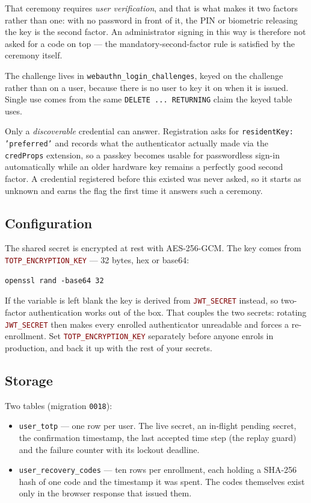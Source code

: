 \documentclass[12pt,a4paper,twoside]{report}
\newcommand{\code}[1]{\texttt{#1}}
\newcommand{\env}[1]{\texttt{\textcolor{Maroon}{#1}}}
\begin{document}
That ceremony requires \emph{user verification}, and that is what makes it two
factors rather than one: with no password in front of it, the PIN or biometric
releasing the key is the second factor. An administrator signing in this way is
therefore not asked for a code on top --- the mandatory-second-factor rule is
satisfied by the ceremony itself.

The challenge lives in \code{webauthn\_login\_challenges}, keyed on the challenge
rather than on a user, because there is no user to key it on when it is issued.
Single use comes from the same \code{DELETE ... RETURNING} claim the keyed table
uses.

Only a \emph{discoverable} credential can answer. Registration asks for
\code{residentKey: 'preferred'} and records what the authenticator actually made
via the \code{credProps} extension, so a passkey becomes usable for passwordless
sign-in automatically while an older hardware key remains a perfectly good second
factor. A credential registered before this existed was never asked, so it starts
as unknown and earns the flag the first time it answers such a ceremony.

\subsection*{Configuration}

The shared secret is encrypted at rest with AES-256-GCM. The key comes from
\env{TOTP\_ENCRYPTION\_KEY} — 32 bytes, hex or base64:

\begin{lstlisting}[style=bash]
openssl rand -base64 32
\end{lstlisting}

If the variable is left blank the key is derived from \env{JWT\_SECRET} instead,
so two-factor authentication works out of the box. That couples the two secrets:
rotating \env{JWT\_SECRET} then makes every enrolled authenticator unreadable and
forces a re-enrollment. Set \env{TOTP\_ENCRYPTION\_KEY} separately before anyone
enrols in production, and back it up with the rest of your secrets.

\subsection*{Storage}

Two tables (migration \code{0018}):

\begin{itemize}
  \item \code{user\_totp} — one row per user. The live secret, an in-flight
        pending secret, the confirmation timestamp, the last accepted time step
        (the replay guard) and the failure counter with its lockout deadline.
  \item \code{user\_recovery\_codes} — ten rows per enrollment, each holding a
        SHA-256 hash of one code and the timestamp it was spent. The codes
        themselves exist only in the browser response that issued them.
\end{itemize}
\end{document}
